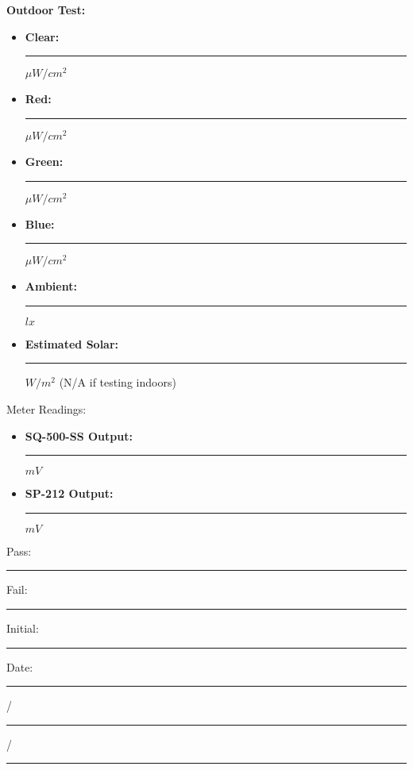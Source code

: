 {\Large \textbf{Outdoor Test:} }\\
\begin{itemize}
\item \textbf{Clear:} \rule{2cm}{0.15mm} $\mu W/cm^2$
\item \textbf{Red:} \rule{2cm}{0.15mm} $\mu W/cm^2$
\item \textbf{Green:} \rule{2cm}{0.15mm} $\mu W/cm^2$
\item \textbf{Blue:} \rule{2cm}{0.15mm} $\mu W/cm^2$
\item \textbf{Ambient:} \rule{2cm}{0.15mm} $lx$
\item \textbf{Estimated Solar:} \rule{2cm}{0.15mm} $W/m^2$ (N/A if testing indoors)
\end{itemize}
{\Large Meter Readings: }\\
\begin{itemize}
\item \textbf{SQ-500-SS Output:} \rule{2cm}{0.15mm} $mV$
\item \textbf{SP-212 Output:} \rule{2cm}{0.15mm} $mV$
\end{itemize}
\vfill
{\large Pass: \rule{1cm}{0.15mm} \hspace{1cm} Fail: \rule{1cm}{0.15mm}} \hfill Initial: \rule{2cm}{0.15mm} \hspace{1cm} Date: \rule{0.5cm}{0.15mm}/\rule{0.5cm}{0.15mm}/\rule{1cm}{0.15mm}\\[5pt]

